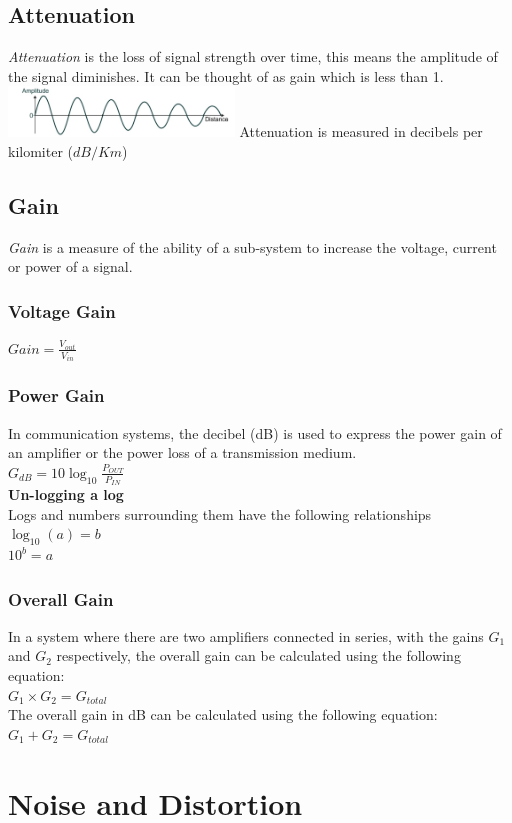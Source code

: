 \documentclass[a4paper,11pt, twocolumn]{article}
\begin{document}
\subsection{Attenuation}
\textit{Attenuation} is the loss of signal strength over time, this means the amplitude of the signal diminishes. It can be thought of as gain which is less than 1. 
\includegraphics[width=0.45\textwidth]{attenuation.jpg}
\noindent Attenuation is measured in decibels per kilomiter ($dB/Km$)
\subsection{Gain}
\textit{Gain} is a measure of the ability of a sub-system to increase the voltage, current or power of a signal. 
\subsubsection{Voltage Gain}
$\displaystyle Gain = \frac{V_{out}}{V_{in}}$
\subsubsection{Power Gain}
In communication systems, the decibel (dB) is used to express the power gain of an amplifier or the power loss of a transmission medium.\\
$\displaystyle G_{dB} = 10 \log_{10}\frac{P_{OUT}}{P_{IN}}$\\
\textbf{Un-logging a log}\\
Logs and numbers surrounding them have the following relationships\\
$\displaystyle \log_{10}(a) = b$\\
$\displaystyle 10^b = a$
\subsubsection{Overall Gain}
In a system where there are two amplifiers connected in series, with the gains $G_1$ and $G_2$ respectively, the overall gain can be calculated using the following equation:\\
$G_1\times G_2 = G_{total}$\\
The overall gain in dB can be calculated using the following equation:\\
$G_1 + G_2 = G_{total}$

\section{Noise and Distortion}
\end{document}
